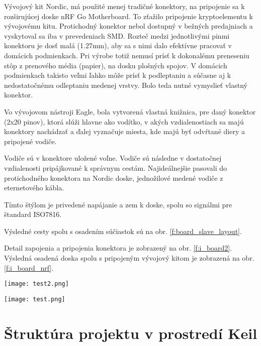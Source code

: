 \documentclass[12pt,a4wide,oneside,openright]{report}
\begin{document}
	Vývojový kit Nordic, má použité menej tradičné konektory, na pripojenie sa k rozširujúcej doske nRF Go Motherboard. To zťažilo pripojenie kryptoelementu k vývojovému kitu. Protichodný konektor nebol dostupný v bežných predajniach a vyskytoval sa iba v prevedeniach SMD. 
	Rozteč medzi jednotlivými pinmi konektoru je dosť malá (1.27mm), aby sa s nimi dalo efektívne pracovať v domácich podmienkach. Pri výrobe totiž nemusí prísť k dokonalému preneseniu stôp z prenového média (papier), na dosku plošných spojov. V domácich podmienkach takisto veľmi ľahko môže prísť k podleptaniu a súčasne aj k nedostatočnému odleptaniu medenej vrstvy. Bolo teda nutné vymyslieť vlastný konektor.	
	
	Vo vývojovom nástroji Eagle, bola vytvorená vlastná knižnica, pre daný konektor (2x20 pinov), ktorá slúži hlavne ako vodítko, v akých vzdialenostiach sa majú konektory nachádzať a ďalej vyznačuje miesta, kde majú byť odvŕtané diery a pripojené vodiče.
	
	Vodiče sú v konektore uložené voľne. Vodiče sú následne v dostatočnej vzdialenosti pripájkované k správnym cestám. Najideálnejšie pasovali do protichodného konektora na Nordic doske, jednožilové medené vodiče z eternetového kábla.
	
	Tímto štýlom je privedené napájanie a zem k doske, spolu so signálmi pre štandard ISO7816. 
	
	Výsledné cesty spolu s osadením súčiastok sú na obr. \ref{f:board_slave_layout}.
	
	Detail zapojenia a pripojenia konektora je zobrazený na obr. \ref{f:i_board2}.
	Výsledná osadená doska spolu s pripojeným vývojový kitom je zobrazená na obr. \ref{f:i_board_nrf}.
	
	\begin{figure*}[!htb]
		\centering
		\texttt{[image: test2.png]}
		\caption{Schéma zapojenia a pripojenia slave zariadenia s kryptoelementom.}
		\label{f:board_slave_schematic}
	\end{figure*}
	
	\begin{figure*}[!htb]
		\centering
		\texttt{[image: test.png]}
		\caption{Rozloženie súčiastok na doske plošných spojov pre slave.}
		\label{f:board_slave_layout}
	\end{figure*}

\section{Štruktúra projektu v prostredí Keil}
\end{document}
